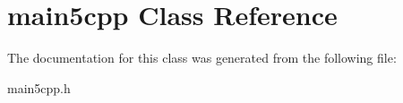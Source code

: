 \hypertarget{classmain5cpp}{}\section{main5cpp Class Reference}
\label{classmain5cpp}


The documentation for this class was generated from the following file\+:\begin{DoxyCompactItemize}
\item 
main5cpp.\+h\end{DoxyCompactItemize}
